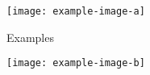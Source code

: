 \documentclass{report}
\begin{document}
\lipsum[1-6]
\lipsum[4][1-2]
\begin{figure}[p]
  \texttt{[image: example-image-a]}
  \caption{Examples}
\end{figure}
\begin{figure}[p]
  \ContinuedFloat
  \texttt{[image: example-image-b]}
\end{figure}
\lipsum[1][1-2]
\lipsum[1]
\end{document}
